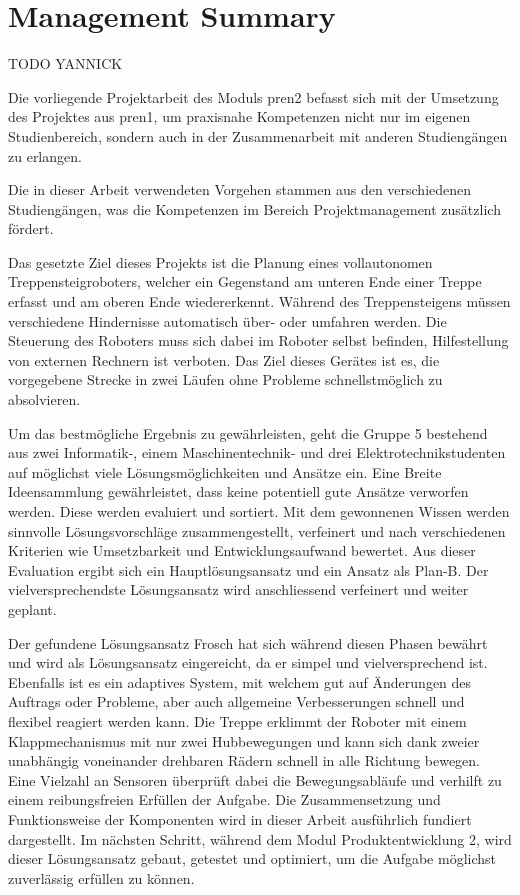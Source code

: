 \newpage
\section*{Management Summary}

TODO YANNICK

Die vorliegende Projektarbeit des Moduls \acrfull{pren2} befasst sich mit der Umsetzung des Projektes aus \acrfull{pren1}, um praxisnahe Kompetenzen nicht nur im eigenen Studienbereich, sondern auch in der Zusammenarbeit mit anderen Studiengängen zu erlangen.

Die in dieser Arbeit verwendeten Vorgehen stammen aus den verschiedenen Studiengängen, was die Kompetenzen im Bereich Projektmanagement zusätzlich fördert.

Das gesetzte Ziel dieses Projekts ist die Planung eines vollautonomen Treppensteigroboters, welcher ein Gegenstand am unteren Ende einer Treppe erfasst und am oberen Ende wiedererkennt. Während des Treppensteigens müssen verschiedene Hindernisse automatisch über- oder umfahren werden. Die Steuerung des Roboters muss sich dabei im Roboter selbst befinden, Hilfestellung von externen Rechnern ist verboten. Das Ziel dieses Gerätes ist es, die vorgegebene Strecke in zwei Läufen ohne Probleme schnellstmöglich zu absolvieren.

Um das bestmögliche Ergebnis zu gewährleisten, geht die Gruppe 5 bestehend aus zwei Informatik-, einem Maschinentechnik- und drei Elektrotechnikstudenten auf möglichst viele Lösungsmöglichkeiten und Ansätze ein. Eine Breite Ideensammlung gewährleistet, dass keine potentiell gute Ansätze verworfen werden. Diese werden evaluiert und sortiert. Mit dem gewonnenen Wissen werden sinnvolle Lösungsvorschläge zusammengestellt, verfeinert und nach verschiedenen Kriterien wie Umsetzbarkeit und Entwicklungsaufwand bewertet. Aus dieser Evaluation ergibt sich ein Hauptlösungsansatz und ein Ansatz als Plan-B. Der vielversprechendste Lösungsansatz wird anschliessend verfeinert und weiter geplant.

Der gefundene Lösungsansatz \glqq Frosch\grqq{} hat sich während diesen Phasen bewährt und wird als Lösungsansatz eingereicht, da er simpel und vielversprechend ist. Ebenfalls ist es ein adaptives System, mit welchem gut auf Änderungen des Auftrags oder Probleme, aber auch allgemeine Verbesserungen schnell und flexibel reagiert werden kann. Die Treppe erklimmt der Roboter mit einem Klappmechanismus mit nur zwei Hubbewegungen und kann sich dank zweier unabhängig voneinander drehbaren Rädern schnell in alle Richtung bewegen. Eine Vielzahl an Sensoren überprüft dabei die Bewegungsabläufe und verhilft zu einem reibungsfreien Erfüllen der Aufgabe. Die Zusammensetzung und Funktionsweise der Komponenten wird in dieser Arbeit ausführlich fundiert dargestellt.
Im nächsten Schritt, während dem Modul Produktentwicklung 2, wird dieser Lösungsansatz gebaut, getestet und optimiert, um die Aufgabe möglichst zuverlässig erfüllen zu können.
